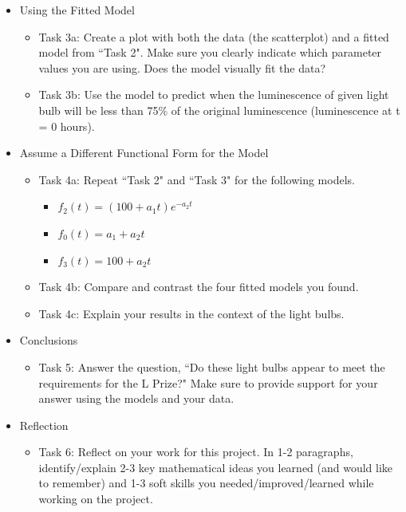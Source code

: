 \documentclass{article}
\theoremstyle{plain}
\theoremstyle{box}
\begin{document}
\begin{itemize}
\begin{itemize}
	\end{itemize}
\item Using the Fitted Model
	\begin{itemize}
	\item Task 3a: Create a plot with both the data (the scatterplot) and a fitted model from ``Task 2". Make sure you clearly indicate which parameter values you are using. Does the model visually fit the data?
	\item Task 3b: Use the model to predict when the luminescence of given light bulb will be less than 75\% of the original luminescence (luminescence at t = 0 hours).
	\end{itemize}
\item Assume a Different Functional Form for the Model
	\begin{itemize}
	\item Task 4a: Repeat ``Task 2" and ``Task 3" for the following models.
		\begin{itemize}
		\item $\displaystyle f_2(t) = (100 + a_1t)e^{-a_2t}$
		\item $\displaystyle f_0(t) = a_1 + a_2 t$
		\item $\displaystyle f_3(t) = 100 + a_2 t$
		\end{itemize}
	\item Task 4b: Compare and contrast the four fitted models you found.
	\item Task 4c: Explain your results in the context of the light bulbs.
	\end{itemize}
\item Conclusions
	\begin{itemize}
	\item Task 5: Answer the question, ``Do these light bulbs appear to meet the requirements for the L Prize?" Make sure to provide support for your answer using the models and your data. 
	\end{itemize}
\item Reflection
	\begin{itemize}
	\item Task 6: Reflect on your work for this project. In 1-2 paragraphs, identify/explain 2-3 key mathematical  ideas you learned (and would like to remember) and 1-3 soft skills you needed/improved/learned while working on the project.
	\end{itemize}
\end{itemize}


 
\end{document}
